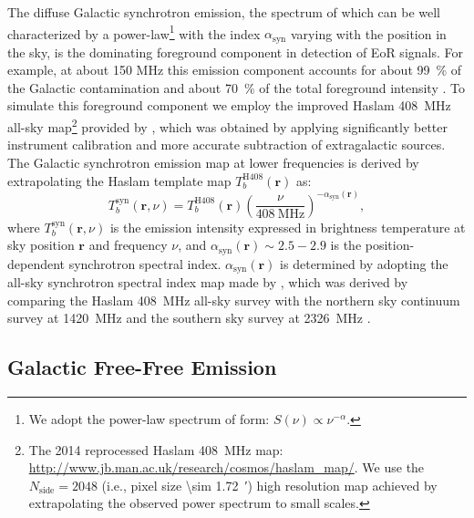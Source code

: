\documentclass[modern]{aastex61}
\newcommand{\R}[1]{\mathrm{#1}}
\begin{document}
The diffuse Galactic synchrotron emission, the spectrum of which can be
well characterized by a power-law\footnote{We adopt the power-law spectrum
  of form: $S(\nu) \propto \nu^{-\alpha}$.} with
the index $\alpha_{\R{syn}}$ varying with the position in the sky, is the
dominating foreground component in detection of EoR signals.
For example, at about 150 MHz this emission component accounts for about
\SI{99}{\percent} of the Galactic contamination and about \SI{70}{\percent}
of the total foreground intensity \citep{shaver1999,jelic2008}.
To simulate this foreground component we employ the improved
Haslam \SI{408}{\MHz} all-sky map\footnote{%
  The 2014 reprocessed Haslam \SI{408}{\MHz} map:
  \url{http://www.jb.man.ac.uk/research/cosmos/haslam_map/}.
  We use the $N_{\R{side}} = 2048$ (i.e., pixel size \SI{\sim 1.72}{\arcmin})
  high resolution map achieved by extrapolating the observed power spectrum
  to small scales.}
provided by \citealt{remazeilles2015}, which was obtained by applying
significantly better instrument calibration and more accurate subtraction
of extragalactic sources.
The Galactic synchrotron emission map at lower frequencies is derived
by extrapolating the Haslam template map $T_b^{\R{H408}}(\bm{r})$ as:
\begin{equation}
  \label{eq:gsync-extrap}
  T_b^{\R{syn}}(\bm{r}, \nu) = T_b^{\R{H408}}(\bm{r})
    \left( \frac{\nu}{\SI{408}{\MHz}} \right)^{-\alpha_{\R{syn}}(\bm{r})},
\end{equation}
where $T_b^{\R{syn}}(\bm{r}, \nu)$ is the emission intensity expressed in
brightness temperature at sky position $\bm{r}$ and frequency $\nu$,
and $\alpha_{\R{syn}}(\bm{r}) \sim 2.5-2.9$ is the position-dependent
synchrotron spectral index.
$\alpha_{\R{syn}}(\bm{r})$ is determined by adopting the all-sky
synchrotron spectral index map made by \citet{giardino2002},
which was derived by comparing the Haslam \SI{408}{\MHz} all-sky survey
with the northern sky continuum survey at \SI{1420}{\MHz} \citep{reich1986}
and the southern sky survey at \SI{2326}{\MHz} \citep{jonas1998}.


\subsection{Galactic Free-Free Emission}
\label{sec:fg-gfree}
\end{document}

